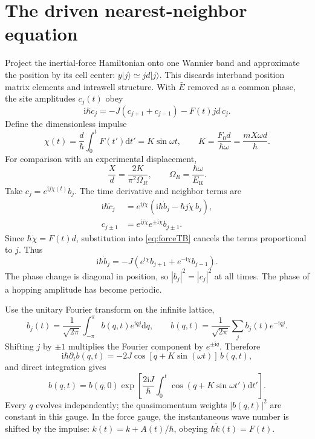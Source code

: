 \documentclass[11pt,oneside]{report}
\numberwithin{equation}{chapter}
\newcommand{\ER}{E_{\mathrm R}}
\newcommand{\ii}{\mathrm i}
\newcommand{\dd}{\mathrm d}
\newcommand{\ket}[1]{\lvert #1\rangle}
\begin{document}
\section{The driven nearest-neighbor equation}
Project the inertial-force Hamiltonian onto one Wannier band and approximate the position by its cell center: $y\ket j\simeq jd\ket j$. This discards interband position matrix elements and intrawell structure. With $\bar E$ removed as a common phase, the site amplitudes $c_j(t)$ obey
\begin{equation}\label{eq:forceTB}
 \ii\hbar\dot c_j=-J(c_{j+1}+c_{j-1})-F(t)jd\,c_j.
\end{equation}
Define the dimensionless impulse
\begin{equation}
 \chi(t)=\frac{d}{\hbar}\int_0^tF(t')\dd t'=K\sin\omega t,\qquad K=\frac{F_0d}{\hbar\omega}=\frac{mX\omega d}{\hbar}.
\end{equation}
For comparison with an experimental displacement,
\begin{equation}
 \frac{X}{d}=\frac{2K}{\pi^2\Omega_R},\qquad \Omega_R=\frac{\hbar\omega}{\ER}.
\end{equation}
Take $c_j=e^{\ii j\chi(t)}b_j$. The time derivative and neighbor terms are
\begin{align}
 \ii\hbar\dot c_j&=e^{\ii j\chi}(\ii\hbar\dot b_j-\hbar j\dot\chi\,b_j),\\
 c_{j\pm1}&=e^{\ii j\chi}e^{\pm\ii\chi}b_{j\pm1}.
\end{align}
Since $\hbar\dot\chi=F(t)d$, substitution into \cref{eq:forceTB} cancels the terms proportional to $j$. Thus
\begin{equation}\label{eq:Peierls}
 \ii\hbar\dot b_j=-J(e^{\ii\chi}b_{j+1}+e^{-\ii\chi}b_{j-1}).
\end{equation}
The phase change is diagonal in position, so $|b_j|^2=|c_j|^2$ at all times. The phase of a hopping amplitude has become periodic.

Use the unitary Fourier transform on the infinite lattice,
\begin{equation}
 b_j(t)=\frac{1}{\sqrt{2\pi}}\int_{-\pi}^{\pi}b(q,t)e^{\ii qj}\dd q,\qquad
 b(q,t)=\frac{1}{\sqrt{2\pi}}\sum_jb_j(t)e^{-\ii qj}.
\end{equation}
Shifting $j$ by $\pm1$ multiplies the Fourier component by $e^{\pm\ii q}$. Therefore
\begin{equation}\label{eq:dispersiontime}
 \ii\hbar\partial_tb(q,t)=-2J\cos[q+K\sin(\omega t)]\,b(q,t),
\end{equation}
and direct integration gives
\begin{equation}\label{eq:exactq}
 b(q,t)=b(q,0)\exp\left[\frac{2\ii J}{\hbar}\int_0^t\cos(q+K\sin\omega t')\dd t'\right].
\end{equation}
Every $q$ evolves independently; the quasimomentum weights $|b(q,t)|^2$ are constant in this gauge. In the force gauge, the instantaneous wave number is shifted by the impulse: $k(t)=k+A(t)/\hbar$, obeying $\hbar\dot k(t)=F(t)$.
\end{document}
